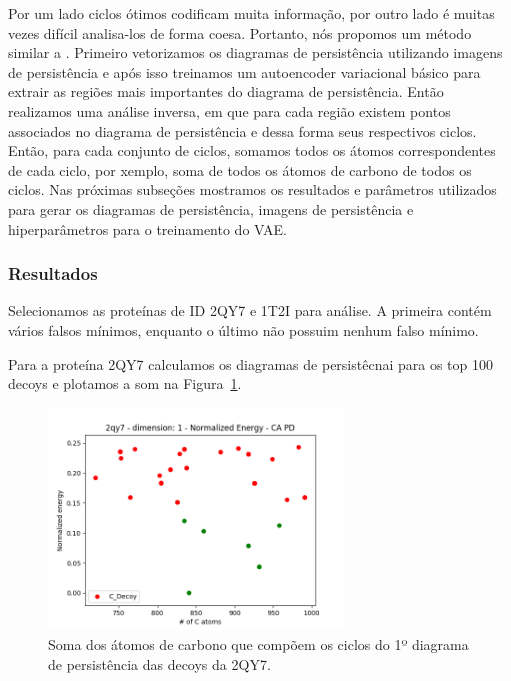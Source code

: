 Por um lado ciclos ótimos codificam muita informação, por outro lado é muitas vezes difícil analisa-los
de forma coesa. Portanto, nós propomos um método similar a \cite{Obayashi2018}. Primeiro vetorizamos
os diagramas de persistência utilizando imagens de persistência \cite{Adams2017} e após isso treinamos
um autoencoder variacional básico \cite{kingma2013} para extrair as regiões mais importantes
do diagrama de persistência. Então realizamos uma análise inversa, em que para
cada região existem pontos associados no diagrama de persistência e dessa forma seus
respectivos ciclos. Então, para cada conjunto de ciclos, somamos todos os átomos correspondentes de
cada ciclo, por xemplo, soma de todos os átomos de carbono de todos os ciclos. Nas próximas subseções
mostramos os resultados e parâmetros utilizados para gerar os diagramas de persistência, imagens
de persistência e hiperparâmetros para o treinamento do VAE.

\subsubsection{Resultados}

Selecionamos as proteínas de ID 2QY7 e 1T2I para análise. A primeira contém vários falsos mínimos,
enquanto o último não possuim nenhum falso mínimo.

Para a proteína 2QY7 calculamos os diagramas de persistêcnai para os top 100 decoys e plotamos a
som na Figura~\ref{fig:cyc2qy7}.

\begin{figure}[!htbp]
    \centering
    \includegraphics[width=0.7\textwidth]{images/relatorio/cyc2qy7.png}
    \caption{Soma dos átomos de carbono que compõem os ciclos do
            1º diagrama de persistência das decoys da 2QY7.}
    \label{fig:cyc2qy7}
\end{figure}

